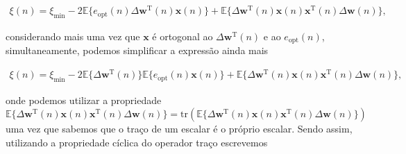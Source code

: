 \documentclass[a4paper,10pt]{article}
\begin{document}
\begin{enumerate}
\begin{enumerate}
						\begin{align}
							\xi(n) = \xi_{\text{min}} - 2 \mathbb{E}\{e_{\text{opt}}(n) \Delta \mathbf{w}^{\text{T}}(n) \mathbf{x}(n)\} + \mathbb{E}\{\Delta \mathbf{w}^{\text{T}}(n) \mathbf{x}(n) \mathbf{x}^{\text{T}}(n) \Delta \mathbf{w}(n)\},
						\end{align}

						considerando mais uma vez que $\mathbf{x}$ é ortogonal ao $\Delta \mathbf{w}^{\text{T}}(n)$ e ao $e_{\text{opt}}(n)$, simultaneamente, podemos simplificar a expressão ainda mais 

						\begin{align}
							\xi(n) = \xi_{\text{min}} - 2 \mathbb{E}\{\Delta \mathbf{w}^{\text{T}}(n)\} \mathbb{E}\{e_{\text{opt}}(n) \mathbf{x}(n)\} + \mathbb{E}\{\Delta \mathbf{w}^{\text{T}}(n) \mathbf{x}(n) \mathbf{x}^{\text{T}}(n) \Delta \mathbf{w}(n)\},
						\end{align}

						onde podemos utilizar a propriedade $\mathbb{E}\{\Delta \mathbf{w}^{\text{T}}(n) \mathbf{x}(n) \mathbf{x}^{\text{T}}(n) \Delta \mathbf{w}(n)\} = \text{tr}(\mathbb{E}\{\Delta \mathbf{w}^{\text{T}}(n) \mathbf{x}(n) \mathbf{x}^{\text{T}}(n) \Delta \mathbf{w}(n)\})$ uma vez
						que sabemos que o traço de um escalar é o próprio escalar. Sendo assim, utilizando a propriedade cíclica do operador traço escrevemos


\end{enumerate}
\end{enumerate}
\end{document}
